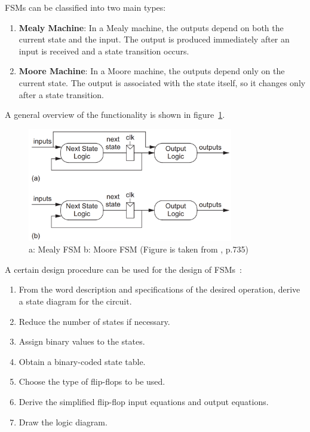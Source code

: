 \noindent
FSMs can be classified into two main types:

\begin{enumerate}
    \item \textbf{Mealy Machine}: In a Mealy machine, the outputs depend on both the current state and the input. The output is produced immediately after an input is received and a state transition occurs. 
    
    \item \textbf{Moore Machine}: In a Moore machine, the outputs depend only on the current state. The output is associated with the state itself, so it changes only after a state transition.
\end{enumerate}

A general overview of the functionality is shown in figure~\ref{fig:general_fsm}.

\begin{figure}[H]
    \centering
    \includegraphics[width=0.8\textwidth]{Figures/general fsm diagrams.png}
    \caption{a: Mealy FSM b: Moore FSM (Figure is taken from \cite{CMOS_VLSI_design}, p.735)}
    \label{fig:general_fsm}
\end{figure}


\noindent
A certain design procedure can be used for the design of FSMs~\cite{digital_design}:

\begin{enumerate}
  \item From the word description and specifications of the desired operation, derive a state diagram for the circuit.
  \item Reduce the number of states if necessary.
  \item Assign binary values to the states.
  \item Obtain a binary-coded state table.
  \item Choose the type of flip-flops to be used.
  \item Derive the simplified flip-flop input equations and output equations.
  \item Draw the logic diagram.
\end{enumerate}


